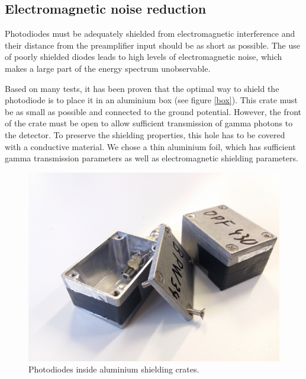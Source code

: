 \subsection{Electromagnetic noise reduction}
Photodiodes must be adequately shielded from electromagnetic interference and their distance from the preamplifier input should be as short as possible. The use of poorly shielded diodes leads to high levels of electromagnetic noise, which makes a large part of the energy spectrum unobservable.
\par
Based on many tests, it has been proven that the optimal way to shield the photodiode is to place it in an aluminium box (see figure \ref{box}). This crate must be as small as possible and connected to the ground potential. However, the front of the crate must be open to allow sufficient transmission of gamma photons to the detector. To preserve the shielding properties, this hole has to be covered with a conductive material. We chose a thin aluminium foil, which has sufficient gamma transmission parameters as well as electromagnetic shielding parameters.

\begin{figure}[H]
 \centering
 \includegraphics[scale=0.09, angle = 0]{./pictures/ShieldCrate.jpg}
 \caption{Photodiodes inside aluminium shielding crates.}
 \label{crate}
 
\end{figure}


